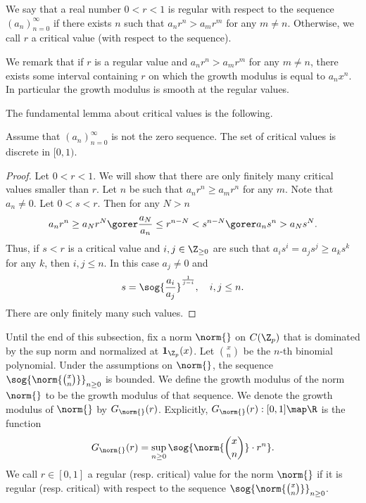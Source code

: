 We say that a real number $0<r<1$ is regular with respect to the sequence $(a_n)_{n=0}^\infty$ if there exists $n$ such that $a_nr^n>a_mr^m$ for any $m\neq n$.
Otherwise, we call $r$ a critical value (with respect to the sequence).

We remark that if $r$ is a regular value and $a_nr^n>a_mr^m$ for any $m\neq n$, there exists some interval containing $r$ on which the growth modulus is equal to $a_nx^n$.
In particular the growth modulus is smooth at the regular values.

The fundamental lemma about critical values is the following.
\begin{lem}\label{discreteness_of_critical_values}
Assume that $(a_n)_{n=0}^\infty$ is not the zero sequence.
The set of critical values is discrete in $[0,1)$. 
\end{lem} 
    \begin{proof}
    Let $0<r<1$.
    We will show that there are only finitely many critical values smaller than $r$.
    Let $n$ be such that $a_nr^n\geq a_mr^n$ for any $m$.
    Note that $a_n\neq 0$.
    Let $0<s<r$.
    Then for any $N>n$
    \[a_nr^n\geq a_Nr^N \gorer \frac{a_N}{a_n}\leq r^{n-N}<s^{n-N} \gorer a_ns^n>a_Ns^N.\]
    Thus, if $s<r$ is a critical value and $i,j\in\Z_{\geq0}$ are such that $a_is^i=a_js^j\geq a_ks^k$ for any $k$, then $i,j\leq n$.
    In this case $a_j\neq 0$ and
    \[s=\sog{\frac{a_i}{a_j}}^{\frac{1}{j-i}},\ \ \ i,j\leq n.\]
    There are only finitely many such values.   
    \end{proof} 


Until the end of this subsection, fix a norm $\norm{}$ on $C(\Z_p)$ that is dominated by the sup norm and normalized at $\textbf{1}_{\Z_p}(x)$.
Let $\binom{x}{n}$ be the $n$-th binomial polynomial.
Under the assumptions on $\norm{}$, the sequence $\sog{\norm{\binom{x}{n}}}_{n\geq 0}$ is bounded. 
We define the growth modulus of the norm $\norm{}$ to be the growth modulus of that sequence.
We denote the growth modulus of $\norm{}$ by $G_{\norm{}}(r)$.
Explicitly, $G_{\norm{}}(r):[0,1]\map\R$ is the function 
\[G_{\norm{}}(r)=\sup_{n\geq 0}\sog{\norm{\binom{x}{n}}\cdot r^n}.\]
We call $r\in[0,1]$ a regular (resp. critical) value for the norm $\norm{}$ if it is regular (resp. critical) with respect to the sequence $\sog{\norm{\binom{x}{n}}}_{n\geq 0}$.

